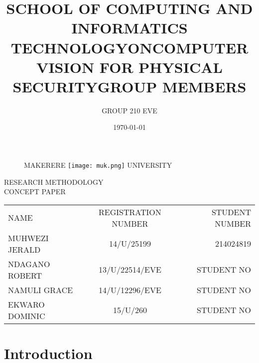 \documentclass[11pt]{article}
\begin{document}
		
\title{SCHOOL OF COMPUTING AND INFORMATICS\\ TECHNOLOGY}
\author{GROUP 210 EVE}
\date{\today{}}
\begin{figure}
	\begin{center}
	\Huge MAKERERE \texttt{[image: muk.png]} \Huge UNIVERSITY
	\end{center}
\end{figure}
	\maketitle
	
	\begin{center}
	RESEARCH METHODOLOGY \\CONCEPT PAPER
	\end{center}
\begin{center}
	\title{ON}
\end{center}
	\begin{center}
		\title{COMPUTER VISION FOR PHYSICAL SECURITY}
	\end{center}
    \begin{center}
    	\title{GROUP MEMBERS}
    	\begin{table}[!th]
    		\begin{tabular}{|l|c|r|}
    			\hline
    			NAME & REGISTRATION NUMBER & STUDENT NUMBER \\
    			MUHWEZI JERALD & 14/U/25199 & 214024819 \\
    			NDAGANO ROBERT & 13/U/22514/EVE & STUDENT NO \\
    			NAMULI GRACE & 14/U/12296/EVE & STUDENT NO \\
    			EKWARO DOMINIC & 15/U/260 & STUDENT NO \\
    			\hline
    		\end{tabular}
    	\end{table}
    \end{center}
	\newpage
	\section{ \textbf{Introduction} }
\end{document}
